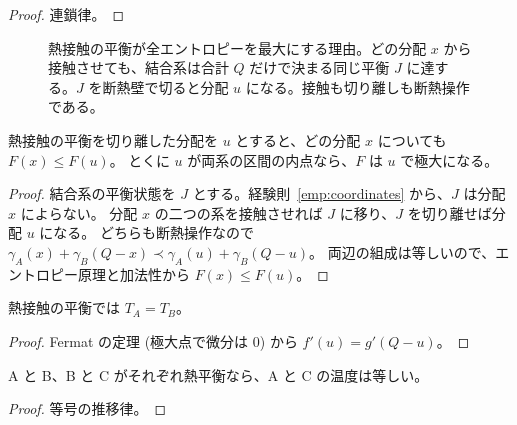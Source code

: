 \begin{proof}
  \leanok
  連鎖律。
\end{proof}

\begin{figure}[htbp]
  \centering
  \caption{熱接触の平衡が全エントロピーを最大にする理由。どの分配 $x$ から接触させても、結合系は合計 $Q$ だけで決まる同じ平衡 $J$ に達する。$J$ を断熱壁で切ると分配 $u$ になる。接触も切り離しも断熱操作である。}
  \label{fig:contact}
\end{figure}

\begin{theorem}[熱接触の平衡は全エントロピーを最大にする]
  \label{thm:contact-max}
  \leanok
  熱接触の平衡を切り離した分配を $u$ とすると、どの分配 $x$ についても $F(x) \le F(u)$。
  とくに $u$ が両系の区間の内点なら、$F$ は $u$ で極大になる。
\end{theorem}

\begin{proof}
  \leanok
  結合系の平衡状態を $J$ とする。経験則~\ref{emp:coordinates} から、$J$ は分配 $x$ によらない。
  分配 $x$ の二つの系を接触させれば $J$ に移り、$J$ を切り離せば分配 $u$ になる。
  どちらも断熱操作なので $\gamma_A(x) + \gamma_B(Q-x) \prec \gamma_A(u) + \gamma_B(Q-u)$。
  両辺の組成は等しいので、エントロピー原理と加法性から $F(x) \le F(u)$。
\end{proof}

\begin{theorem}[熱平衡では温度が等しい]
  \label{thm:exchange-eq}
  \leanok
  熱接触の平衡では $T_A = T_B$。
\end{theorem}

\begin{proof}
  \leanok
  Fermat の定理 (極大点で微分は $0$) から $f'(u) = g'(Q - u)$。
\end{proof}

\begin{theorem}[熱力学第零法則]
  \label{thm:zeroth-law}
  \leanok
  A と B、B と C がそれぞれ熱平衡なら、A と C の温度は等しい。
\end{theorem}

\begin{proof}
  \leanok
  等号の推移律。
\end{proof}

